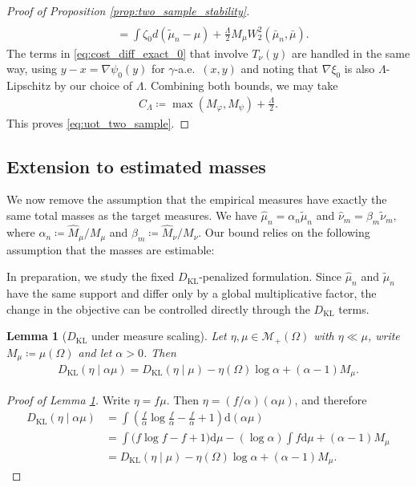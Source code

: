 \documentclass[11pt,reqno]{amsart}
\newtheorem{lemma}[theorem]{Lemma}
\theoremstyle{definition}
\newcommand{\KL}{\mathrm{KL}}
\renewcommand{\d}{\mathrm{d}}
\renewcommand{\hat}{\widehat}
\renewcommand{\tilde}{\widetilde}
\begin{document}
\begin{proof}[Proof of Proposition \ref{prop:two_sample_stability}]
\begin{align*}
    \\
    &=
    \int \zeta_0 d(\tilde\mu_n-\mu)
    + \frac{\Lambda}{2}M_\mu W_2^2(\bar\mu_n,\bar\mu).
\end{align*}
The terms in \eqref{eq:cost_diff_exact_0} that involve $T_\nu(y)$ are handled in the same way, using $y-x=\nabla\psi_0(y)$ for $\gamma$-a.e.\ $(x,y)$ and noting that $\nabla\xi_0$ is also $\Lambda$-Lipschitz by our choice of $\Lambda$.
Combining both bounds, we may take
\begin{align*}
    C_\Lambda \coloneqq \max(M_\varphi,M_\psi)+\frac{\Lambda}{2}.
\end{align*}
This proves \eqref{eq:uot_two_sample}.
\end{proof}


\subsection{Extension to estimated masses}

We now remove the assumption that the empirical measures have exactly the same total masses as the target measures. We have $\hat\mu_n = \alpha_n \tilde\mu_n$ and $ \hat\nu_m = \beta_m \tilde\nu_m,$
where $    \alpha_n \coloneqq {\hat{M}_\mu}/  {M_\mu}$ and $ \beta_m \coloneqq {\hat{M}_\nu} / {M_\nu}$. Our bound relies on the following assumption that the masses are estimable:


{In preparation, we study the fixed $D_\KL$-penalized formulation.}
Since $\hat\mu_n$ and $\tilde\mu_n$ have the same support and differ only by a global multiplicative factor, the change in the objective can be controlled directly through the {$D_\KL$ terms}.

\begin{lemma}[$D_\KL$ under measure scaling]
\label{lem:kl_scaling_reference}
Let $\eta,\mu \in \mathcal{M}_+(\Omega)$ with $\eta \ll \mu$, write $M_\mu \coloneqq \mu(\Omega)$ and let $\alpha>0$. Then
\begin{align}
    {D_\KL}(\eta\mid \alpha\mu) = {D_\KL}(\eta\mid \mu) - \eta(\Omega)\log \alpha + (\alpha-1)M_\mu.
\end{align}
\end{lemma}


\begin{proof}[Proof of Lemma \ref{lem:kl_scaling_reference}]
Write $\eta = f\mu$. Then $\eta = (f/\alpha)(\alpha\mu)$, and therefore
\begin{align*}
    {D_\KL}(\eta\mid \alpha\mu)
    &= \int \left( \frac{f}{\alpha}\log\frac{f}{\alpha} - \frac{f}{\alpha} + 1 \right)  \d(\alpha\mu) \\
    &= \int \bigl( f\log f - f + 1 \bigr)  \d\mu - (\log \alpha)\int f \d\mu + (\alpha-1)M_\mu \\
    &= {D_\KL}(\eta\mid \mu) - \eta(\Omega)\log \alpha + (\alpha-1)M_\mu.
\end{align*}
\end{proof}
\end{document}
